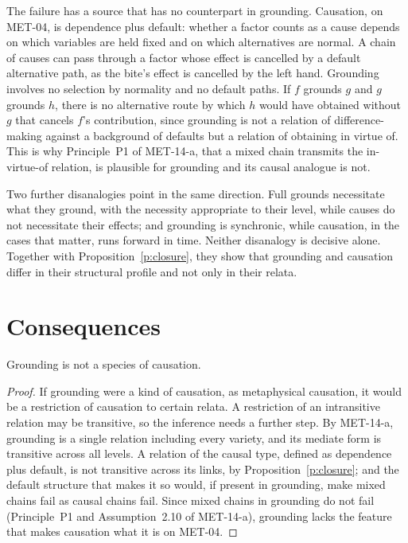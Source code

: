 \documentclass{situationist-preprint}
\begin{document}
The failure has a source that has no counterpart in grounding. Causation, on MET-04, is dependence plus default: whether a factor counts as a cause depends on which variables are held fixed and on which alternatives are normal. A chain of causes can pass through a factor whose effect is cancelled by a default alternative path, as the bite's effect is cancelled by the left hand. Grounding involves no selection by normality and no default paths. If $f$ grounds $g$ and $g$ grounds $h$, there is no alternative route by which $h$ would have obtained without $g$ that cancels $f$'s contribution, since grounding is not a relation of difference-making against a background of defaults but a relation of obtaining in virtue of. This is why Principle~P1 of MET-14-a, that a mixed chain transmits the in-virtue-of relation, is plausible for grounding and its causal analogue is not.

Two further disanalogies point in the same direction. Full grounds necessitate what they ground, with the necessity appropriate to their level, while causes do not necessitate their effects; and grounding is synchronic, while causation, in the cases that matter, runs forward in time. Neither disanalogy is decisive alone. Together with Proposition~\ref{p:closure}, they show that grounding and causation differ in their structural profile and not only in their relata.

\section{Consequences}

\begin{corollary}\label{c:species}
Grounding is not a species of causation.
\end{corollary}

\begin{proof}
If grounding were a kind of causation, as metaphysical causation, it would be a restriction of causation to certain relata. A restriction of an intransitive relation may be transitive, so the inference needs a further step. By MET-14-a, grounding is a single relation including every variety, and its mediate form is transitive across all levels. A relation of the causal type, defined as dependence plus default, is not transitive across its links, by Proposition~\ref{p:closure}; and the default structure that makes it so would, if present in grounding, make mixed chains fail as causal chains fail. Since mixed chains in grounding do not fail (Principle~P1 and Assumption~2.10 of MET-14-a), grounding lacks the feature that makes causation what it is on MET-04.
\end{proof}
\end{document}
